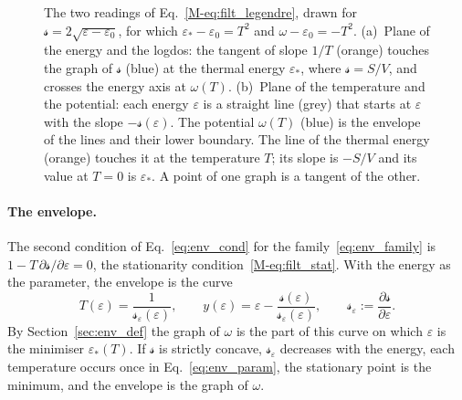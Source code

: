 \documentclass[10pt,a4paper]{article}
\theoremstyle{plain}
\theoremstyle{remark}
\newcommand{\lndos}{{logdos}}  %
\newcommand{\lds}{\mathscr{s}}  %
\begin{document}
\begin{figure}[htbp]
\caption{The two readings of Eq.~\eqref{M-eq:filt_legendre}, drawn for
$\lds=2\sqrt{\varepsilon-\varepsilon_0}$, for which $\varepsilon_*-\varepsilon_0=T^{2}$
and $\omega-\varepsilon_0=-T^{2}$.
(a)~Plane of the energy and the \lndos{}: the tangent of slope $1/T$
(orange) touches the graph of $\lds$ (blue) at the thermal energy
$\varepsilon_*$, where $\lds=S/V$, and crosses the energy axis at
$\omega(T)$.
(b)~Plane of the temperature and the potential: each energy $\varepsilon$
is a straight line (grey) that starts at $\varepsilon$ with the slope
$-\lds(\varepsilon)$. The potential $\omega(T)$ (blue) is the envelope of
the lines and their lower boundary. The line of the thermal energy (orange)
touches it at the temperature $T$; its slope is $-S/V$ and its value at
$T=0$ is $\varepsilon_*$. A point of one graph is a tangent of the other.}
\label{fig:envelope}
\end{figure}

\paragraph{The envelope.} The second condition of Eq.~\eqref{eq:env_cond}
for the family~\eqref{eq:env_family} is
$1-T\,\partial\lds/\partial\varepsilon=0$, the stationarity
condition~\eqref{M-eq:filt_stat}. With the energy as the parameter, the
envelope is the curve
\begin{equation}\label{eq:env_param}
  T(\varepsilon)=\frac{1}{\lds_\varepsilon(\varepsilon)} ,\qquad
  y(\varepsilon)=\varepsilon-\frac{\lds(\varepsilon)}{\lds_\varepsilon(\varepsilon)} ,
  \qquad \lds_\varepsilon:=\frac{\partial\lds}{\partial\varepsilon} .
\end{equation}
By Section~\ref{sec:env_def} the graph of $\omega$ is the part of this
curve on which $\varepsilon$ is the minimiser $\varepsilon_*(T)$. If $\lds$
is strictly concave, $\lds_\varepsilon$ decreases with the energy, each
temperature occurs once in Eq.~\eqref{eq:env_param}, the stationary point
is the minimum, and the envelope is the graph of $\omega$.
\end{document}
